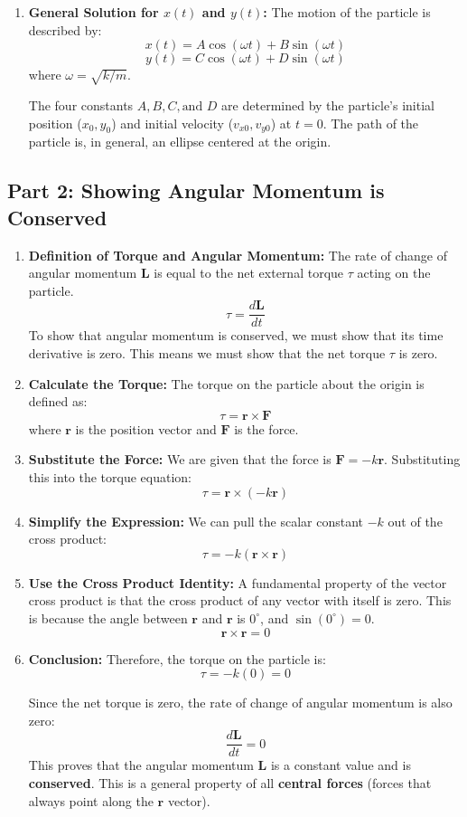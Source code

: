 \documentclass[11pt, a4paper]{article} %
\begin{document}
\begin{enumerate}
    \item \textbf{General Solution for $x(t)$ and $y(t)$:} The motion of the particle is described by:
    $$x(t) = A \cos(\omega t) + B \sin(\omega t)$$
    $$y(t) = C \cos(\omega t) + D \sin(\omega t)$$
    where $\omega = \sqrt{k/m}$.

    The four constants $A, B, C, \text{and } D$ are determined by the particle's initial position ($x_0, y_0$) and initial velocity ($v_{x0}, v_{y0}$) at $t=0$. The path of the particle is, in general, an ellipse centered at the origin.
\end{enumerate}

\hrulefill

\subsection*{Part 2: Showing Angular Momentum is Conserved}

\begin{enumerate}
    \item \textbf{Definition of Torque and Angular Momentum:} The rate of change of angular momentum $\textbf{L}$ is equal to the net external torque $\tau$ acting on the particle.
    $$\tau = \frac{d\textbf{L}}{dt}$$
    To show that angular momentum is conserved, we must show that its time derivative is zero. This means we must show that the net torque $\tau$ is zero.

    \item \textbf{Calculate the Torque:} The torque on the particle about the origin is defined as:
    $$\tau = \textbf{r} \times \textbf{F}$$
    where $\textbf{r}$ is the position vector and $\textbf{F}$ is the force.

    \item \textbf{Substitute the Force:} We are given that the force is $\textbf{F} = -k\textbf{r}$. Substituting this into the torque equation:
    $$\tau = \textbf{r} \times (-k\textbf{r})$$

    \item \textbf{Simplify the Expression:} We can pull the scalar constant $-k$ out of the cross product:
    $$\tau = -k (\textbf{r} \times \textbf{r})$$

    \item \textbf{Use the Cross Product Identity:} A fundamental property of the vector cross product is that the cross product of any vector with itself is zero. This is because the angle between $\textbf{r}$ and $\textbf{r}$ is $0^\circ$, and $\sin(0^\circ) = 0$.
    $$\textbf{r} \times \textbf{r} = 0$$

    \item \textbf{Conclusion:} Therefore, the torque on the particle is:
    $$\tau = -k(0) = 0$$

    Since the net torque is zero, the rate of change of angular momentum is also zero:
    $$\frac{d\textbf{L}}{dt} = 0$$
    This proves that the angular momentum $\textbf{L}$ is a constant value and is \textbf{conserved}. This is a general property of all \textbf{central forces} (forces that always point along the $\textbf{r}$ vector).
\end{enumerate}
\end{document}
